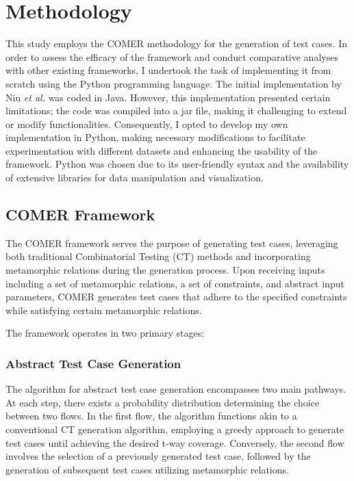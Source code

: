 
\chapter{Methodology}
\label{ch:met}

This study employs the COMER methodology for the generation of test cases.
In order to assess the efficacy of the framework and conduct comparative analyses with other existing frameworks, I undertook the task of implementing it from scratch using the Python programming language.
The initial implementation by Niu \textit{et al.} \cite{comer} was coded in Java.
However, this implementation presented certain limitations; the code was compiled into a jar file, making it challenging to extend or modify functionalities.
Consequently, I opted to develop my own implementation in Python, making necessary modifications to facilitate experimentation with different datasets and enhancing the usability of the framework.
Python was chosen due to its user-friendly syntax and the availability of extensive libraries for data manipulation and visualization.


\section{COMER Framework}\label{sec:comer-framework}

The COMER framework serves the purpose of generating test cases, leveraging both traditional Combinatorial Testing (CT) methods and incorporating metamorphic relations during the generation process.
Upon receiving inputs including a set of metamorphic relations, a set of constraints, and abstract input parameters, COMER generates test cases that adhere to the specified constraints while satisfying certain metamorphic relations.

The framework operates in two primary stages:

\subsection{Abstract Test Case Generation}\label{subsec:abstract-test-case-generation}

The algorithm for abstract test case generation encompasses two main pathways.
At each step, there exists a probability distribution determining the choice between two flows.
In the first flow, the algorithm functions akin to a conventional CT generation algorithm, employing a greedy approach to generate test cases until achieving the desired t-way coverage.
Conversely, the second flow involves the selection of a previously generated test case, followed by the generation of subsequent test cases utilizing metamorphic relations.

